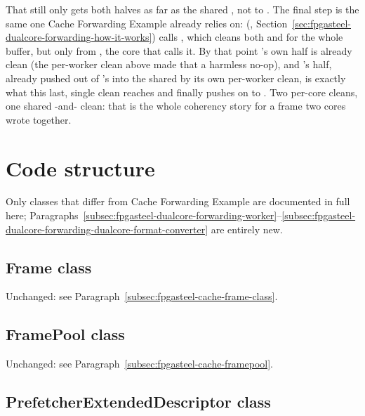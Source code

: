 That still only gets both halves as far as the shared , not to . The final step is the same one Cache Forwarding Example already relies on:  (, Section~\ref{sec:fpgasteel-dualcore-forwarding-how-it-works}) calls , which cleans both  and  for the whole buffer, but only from , the core that calls it. By that point 's own half is already clean (the per-worker clean above made that a harmless no-op), and 's half, already pushed out of 's  into the shared  by its own per-worker clean, is exactly what this last, single  clean reaches and finally pushes on to . Two per-core  cleans, one shared -and- clean: that is the whole coherency story for a frame two cores wrote together.

\section{Code structure}
\label{sec:fpgasteel-dualcore-forwarding-code-structure}

Only classes that differ from Cache Forwarding Example are documented in full here; Paragraphs~\ref{subsec:fpgasteel-dualcore-forwarding-worker}--\ref{subsec:fpgasteel-dualcore-forwarding-dualcore-format-converter} are entirely new.

\subsection{Frame class}
\label{subsec:fpgasteel-dualcore-forwarding-frame}

Unchanged: see Paragraph~\ref{subsec:fpgasteel-cache-frame-class}.

\subsection{FramePool class}
\label{subsec:fpgasteel-dualcore-forwarding-framepool}

Unchanged: see Paragraph~\ref{subsec:fpgasteel-cache-framepool}.

\subsection{PrefetcherExtendedDescriptor class}
\label{subsec:fpgasteel-dualcore-forwarding-prefetcher-extended-descriptor}

